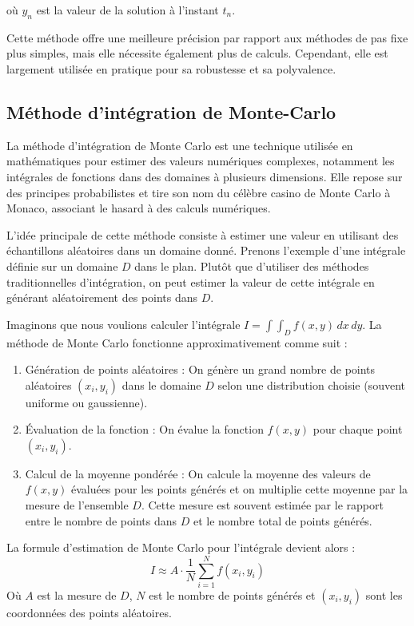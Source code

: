 \documentclass[10pt,a4paper]{article}
\begin{document}
où $y_n$ est la valeur de la solution à l'instant $t_n$.

Cette méthode offre une meilleure précision par rapport aux méthodes de pas fixe plus simples, mais elle nécessite également plus de calculs. Cependant, elle est largement utilisée en pratique pour sa robustesse et sa polyvalence.


\subsection{Méthode d'intégration de Monte-Carlo}

La méthode d'intégration de Monte Carlo est une technique utilisée en mathématiques pour estimer des valeurs numériques complexes, notamment les intégrales de fonctions dans des domaines à plusieurs dimensions. Elle repose sur des principes probabilistes et tire son nom du célèbre casino de Monte Carlo à Monaco, associant le hasard à des calculs numériques.

L'idée principale de cette méthode consiste à estimer une valeur en utilisant des échantillons aléatoires dans un domaine donné. Prenons l'exemple d'une intégrale définie sur un domaine $D$ dans le plan. Plutôt que d'utiliser des méthodes traditionnelles d'intégration, on peut estimer la valeur de cette intégrale en générant aléatoirement des points dans $D$.

Imaginons que nous voulions calculer l'intégrale $I = \int\int_{D} f(x,y) \, dx \, dy$. La méthode de Monte Carlo fonctionne approximativement comme suit :

\begin{enumerate}
    \item Génération de points aléatoires : On génère un grand nombre de points aléatoires $(x_i, y_i)$ dans le domaine $D$ selon une distribution choisie (souvent uniforme ou gaussienne).
    \item Évaluation de la fonction : On évalue la fonction $f(x,y)$ pour chaque point $(x_i, y_i)$.
    \item Calcul de la moyenne pondérée : On calcule la moyenne des valeurs de $f(x,y)$ évaluées pour les points générés et on multiplie cette moyenne par la mesure de l'ensemble $D$. Cette mesure est souvent estimée par le rapport entre le nombre de points dans $D$ et le nombre total de points générés.
\end{enumerate}

La formule d'estimation de Monte Carlo pour l'intégrale devient alors :
$$I \approx A \cdot \frac{1}{N} \sum_{i=1}^{N} f(x_i, y_i)$$
Où $A$ est la mesure de $D$, $N$ est le nombre de points générés et $(x_i, y_i)$ sont les coordonnées des points aléatoires.
\end{document}
